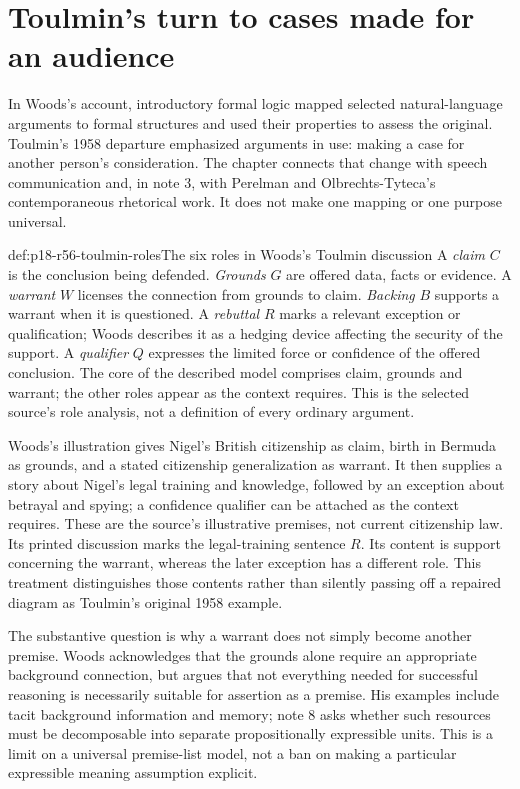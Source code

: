 \section{Toulmin's turn to cases made for an audience}

In Woods's account, introductory formal logic mapped selected
natural-language arguments to formal structures and used their properties
to assess the original. Toulmin's 1958 departure emphasized arguments
in use: making a case for another person's consideration. The chapter
connects that change with speech communication and, in note 3, with
Perelman and Olbrechts-Tyteca's contemporaneous rhetorical work. It
does not make one mapping or one purpose universal.

\begin{hbdefinition}{def:p18-r56-toulmin-roles}{The six roles in Woods's Toulmin discussion}
A \emph{claim} \(C\) is the conclusion being defended.
\emph{Grounds} \(G\) are offered data, facts or evidence.
A \emph{warrant} \(W\) licenses the connection from grounds to claim.
\emph{Backing} \(B\) supports a warrant when it is questioned.
A \emph{rebuttal} \(R\) marks a relevant exception or qualification;
Woods describes it as a hedging device affecting the security of the
support. A \emph{qualifier} \(Q\) expresses the limited force or
confidence of the offered conclusion.
The core of the described model comprises claim, grounds and warrant;
the other roles appear as the context requires. This is the selected
source's role analysis, not a definition of every ordinary argument.
\cite[p.~369]{Woods2021ReasoningArgumentation}
\end{hbdefinition}

Woods's illustration gives Nigel's British citizenship as claim,
birth in Bermuda as grounds, and a stated citizenship generalization
as warrant. It then supplies a story about Nigel's legal training and
knowledge, followed by an exception about betrayal and spying; a
confidence qualifier can be attached as the context requires. These
are the source's illustrative premises, not current citizenship law.
Its printed discussion marks the legal-training sentence \(R\).
Its content is support concerning the warrant, whereas the later
exception has a different role. This treatment distinguishes those
contents rather than silently passing off a repaired diagram as
Toulmin's original 1958 example.

The substantive question is why a warrant does not simply become another
premise. Woods acknowledges that the grounds alone require an appropriate
background connection, but argues that not everything needed for
successful reasoning is necessarily suitable for assertion as a premise.
His examples include tacit background information and memory; note 8
asks whether such resources must be decomposable into separate
propositionally expressible units. This is a limit on a universal
premise-list model, not a ban on making a particular expressible
meaning assumption explicit.

